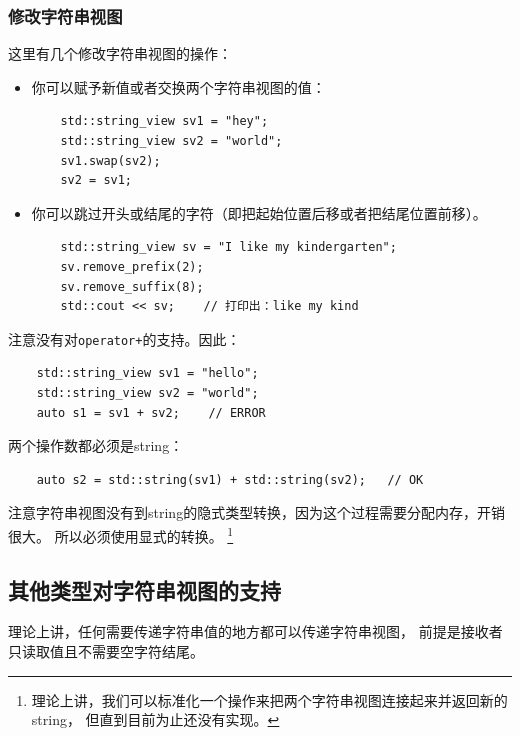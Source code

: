 \subsubsection{修改字符串视图}
这里有几个修改字符串视图的操作：
\begin{itemize}
    \item 你可以赋予新值或者交换两个字符串视图的值：
    \begin{lstlisting}
    std::string_view sv1 = "hey";
    std::string_view sv2 = "world";
    sv1.swap(sv2);
    sv2 = sv1;
    \end{lstlisting}
    \item 你可以跳过开头或结尾的字符（即把起始位置后移或者把结尾位置前移）。
    \begin{lstlisting}
    std::string_view sv = "I like my kindergarten";
    sv.remove_prefix(2);
    sv.remove_suffix(8);
    std::cout << sv;    // 打印出：like my kind
    \end{lstlisting}
\end{itemize}
注意没有对\texttt{operator+}的支持。因此：
\begin{lstlisting}
    std::string_view sv1 = "hello";
    std::string_view sv2 = "world";
    auto s1 = sv1 + sv2;    // ERROR
\end{lstlisting}
两个操作数都必须是string：
\begin{lstlisting}
    auto s2 = std::string(sv1) + std::string(sv2);   // OK
\end{lstlisting}
注意字符串视图没有到string的隐式类型转换，因为这个过程需要分配内存，开销很大。
所以必须使用显式的转换。
\footnote{理论上讲，我们可以标准化一个操作来把两个字符串视图连接起来并返回新的string，
但直到目前为止还没有实现。}

\subsection{其他类型对字符串视图的支持}
理论上讲，任何需要传递字符串值的地方都可以传递字符串视图，
前提是接收者只读取值且不需要空字符结尾。

